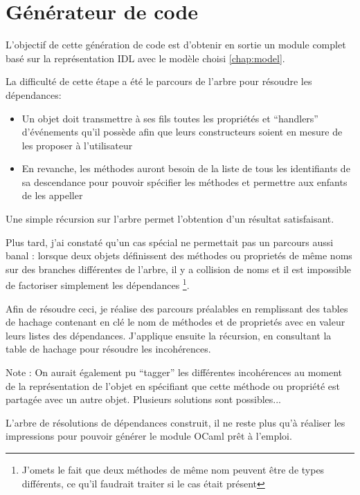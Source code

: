 \documentclass[11pt,a4paper]{report}
\begin{document}
\section{Générateur de code}

L'objectif de cette génération de code est d'obtenir en sortie un module complet basé sur la représentation
IDL avec le modèle choisi \ref{chap:model}.

La difficulté de cette étape a été le parcours de l'arbre pour résoudre les dépendances:
\begin{itemize}
\item Un objet doit transmettre à ses fils toutes les propriétés et ``handlers'' d'événements 
  qu'il possède afin que leurs constructeurs soient en mesure de les proposer à l'utilisateur
\item En revanche, les méthodes auront besoin de la liste de tous les identifiants de sa descendance pour
  pouvoir spécifier les méthodes et permettre aux enfants de les appeller
\end{itemize}\smallskip

Une simple récursion sur l'arbre permet l'obtention d'un résultat satisfaisant.

Plus tard, j'ai constaté qu'un cas spécial ne permettait pas un parcours aussi banal :
lorsque deux objets définissent des méthodes ou proprietés de même noms sur des branches différentes
de l'arbre, il y a collision de noms et il est impossible de factoriser simplement les dépendances
\footnote{J'omets le fait que deux méthodes de même nom peuvent être de types différents, 
ce qu'il faudrait traiter si le cas était présent}.

Afin de résoudre ceci, je réalise des parcours préalables en remplissant des tables de hachage contenant
en clé le nom de méthodes et de proprietés avec en valeur leurs listes des dépendances.
J'applique ensuite la récursion, en consultant la table de hachage pour résoudre les incohérences.

Note : On aurait également pu ``tagger'' les différentes incohérences au moment de la représentation de l'objet
en spécifiant que cette méthode ou propriété est partagée avec un autre objet. Plusieurs solutions sont
possibles...\medskip

L'arbre de résolutions de dépendances construit, il ne reste plus qu'à réaliser les impressions
pour pouvoir générer le module OCaml prêt à l'emploi.

\end{document}
